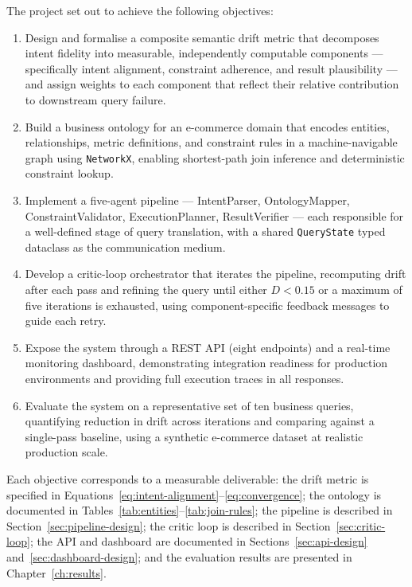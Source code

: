 \documentclass[12pt,a4paper]{report}
\begin{document}
The project set out to achieve the following objectives:

\begin{enumerate}[leftmargin=2em,label=\arabic*.]
  \item Design and formalise a composite semantic drift metric that decomposes intent fidelity into measurable, independently computable components — specifically intent alignment, constraint adherence, and result plausibility — and assign weights to each component that reflect their relative contribution to downstream query failure.
  \item Build a business ontology for an e-commerce domain that encodes entities, relationships, metric definitions, and constraint rules in a machine-navigable graph using \texttt{NetworkX}, enabling shortest-path join inference and deterministic constraint lookup.
  \item Implement a five-agent pipeline — IntentParser, OntologyMapper, ConstraintValidator, ExecutionPlanner, ResultVerifier — each responsible for a well-defined stage of query translation, with a shared \texttt{QueryState} typed dataclass as the communication medium.
  \item Develop a critic-loop orchestrator that iterates the pipeline, recomputing drift after each pass and refining the query until either $D < 0.15$ or a maximum of five iterations is exhausted, using component-specific feedback messages to guide each retry.
  \item Expose the system through a \ac{REST} \ac{API} (eight endpoints) and a real-time monitoring dashboard, demonstrating integration readiness for production environments and providing full execution traces in all responses.
  \item Evaluate the system on a representative set of ten business queries, quantifying reduction in drift across iterations and comparing against a single-pass baseline, using a synthetic e-commerce dataset at realistic production scale.
\end{enumerate}

Each objective corresponds to a measurable deliverable: the drift metric is specified in Equations~\ref{eq:intent-alignment}--\ref{eq:convergence}; the ontology is documented in Tables~\ref{tab:entities}--\ref{tab:join-rules}; the pipeline is described in Section~\ref{sec:pipeline-design}; the critic loop is described in Section~\ref{sec:critic-loop}; the API and dashboard are documented in Sections~\ref{sec:api-design} and~\ref{sec:dashboard-design}; and the evaluation results are presented in Chapter~\ref{ch:results}.
\end{document}
